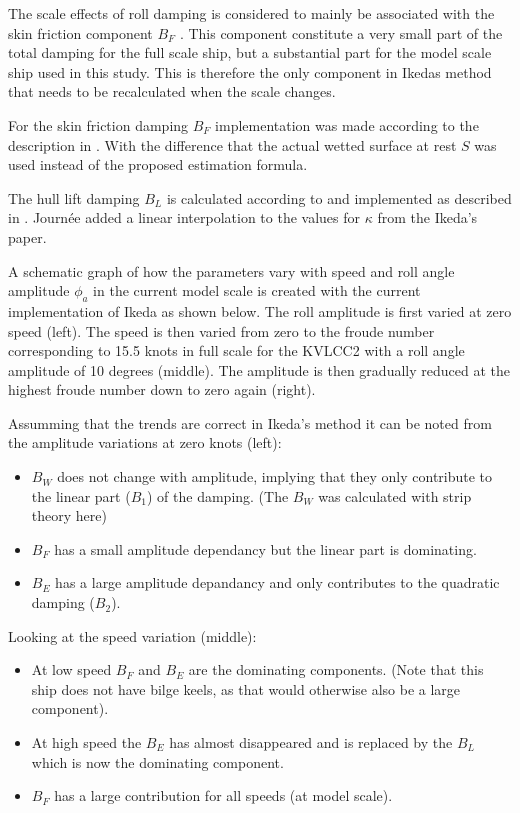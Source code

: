 The scale effects of roll damping is considered to mainly be associated
with the skin friction component $B_F$ \cite{7505983/FB64RGPF}. This
component constitute a very small part of the total damping for the full
scale ship, but a substantial part for the model scale ship used in this
study. This is therefore the only component in Ikedas method that needs
to be recalculated when the scale changes.

For the skin friction damping $B_F$ implementation was made according
to the description in \cite{7505983/UGK6YEVD}. With the difference that
the actual wetted surface at rest $S$ was used instead of the proposed
estimation formula.

The hull lift damping $B_L$ is calculated according to
\cite{7505983/937PN5DT} and implemented as described in
\cite{7505983/UYUAYY7E}. Journée added a linear interpolation to the
values for $\kappa$ from the Ikeda's paper.

A schematic graph of how the parameters vary with speed and roll angle
amplitude $\phi_a$ in the current model scale is created with the
current implementation of Ikeda as shown below. The roll amplitude is
first varied at zero speed (left). The speed is then varied from zero to
the froude number corresponding to 15.5 knots in full scale for the
KVLCC2 with a roll angle amplitude of 10 degrees (middle). The amplitude
is then gradually reduced at the highest froude number down to zero
again (right).

Assumming that the trends are correct in Ikeda's method it can be noted
from the amplitude variations at zero knots (left):

\begin{itemize}
\item $B_W$ does not change with amplitude, implying that they only contribute to the linear part ($B_1$) of the damping. (The $B_W$ was calculated with strip theory here)
\item $B_F$ has a small amplitude dependancy but the linear part is dominating.
\item $B_E$ has a large amplitude depandancy and only contributes to the quadratic damping ($B_2$)\cite{7505983/4AFVVGNT}.
\end{itemize}

Looking at the speed variation (middle):

\begin{itemize}
\item At low speed $B_F$ and $B_E$ are the dominating components. (Note that this ship does not have bilge keels, as that would otherwise also be a large component).
\item At high speed the $B_E$ has almost disappeared and is replaced by the $B_L$ which is now the dominating component.
\item $B_F$ has a large contribution for all speeds (at model scale).
\end{itemize}

